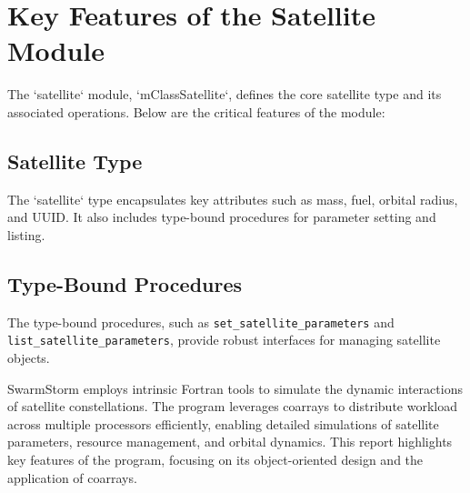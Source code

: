 % 

\section{Key Features of the Satellite Module}
The `satellite` module, `mClassSatellite`, defines the core satellite type and its associated operations. Below are the critical features of the module:

\subsection{Satellite Type}
The `satellite` type encapsulates key attributes such as mass, fuel, orbital radius, and UUID. It also includes type-bound procedures for parameter setting and listing.

 \lstset{ style = fortran }
	

\subsection{Type-Bound Procedures}
The type-bound procedures, such as \texttt{set\_satellite\_parameters} and \texttt{list\_satellite\_parameters}, provide robust interfaces for managing satellite objects.

SwarmStorm employs intrinsic Fortran tools to simulate the dynamic interactions of satellite constellations. The program leverages coarrays to distribute workload across multiple processors efficiently, enabling detailed simulations of satellite parameters, resource management, and orbital dynamics. This report highlights key features of the program, focusing on its object-oriented design and the application of coarrays.

\endinput  %
